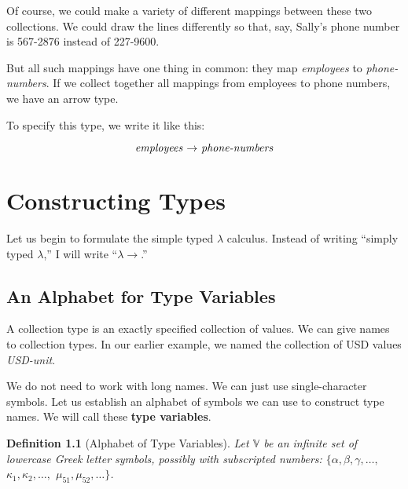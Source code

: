 \documentclass{book}
\numberwithin{equation}{chapter}
\newcommand{\vocab}{\textbf}
\newtheorem{definition}{Definition}
\begin{document}
Of course, we could make a variety of different mappings between these two collections. We could draw the lines differently so that, say, Sally's phone number is 567-2876 instead of 227-9600.

But all such mappings have one thing in common: they map \textit{employees} to \textit{phone-numbers}. If we collect together all mappings from employees to phone numbers, we have an arrow type. 

To specify this type, we write it like this:

\begin{equation}
\text{\textit{employees} $\rightarrow$ \textit{phone-numbers}}
\end{equation}




\chapter{Constructing Types}

Let us begin to formulate the simple typed $\lambda$ calculus. Instead of writing ``simply typed $\lambda$,'' I will write ``$\lambda\rightarrow$.''


\section{An Alphabet for Type Variables}

A collection type is an exactly specified collection of values. We can give names to collection types. In our earlier example, we named the collection of USD values \textit{USD-unit}. 

We do not need to work with long names. We can just use single-character symbols. Let us establish an alphabet of symbols we can use to construct type names. We will call these \vocab{type variables}.

\begin{definition}[Alphabet of Type Variables]
Let $\mathbb{V}$ be an infinite set of lowercase Greek letter symbols, possibly with subscripted numbers: $\{ \alpha, \beta, \gamma, \ldots,$ $\kappa_{1}, \kappa_{2}, \ldots,$ $\mu_{51}, \mu_{52}, \ldots \}$.
\end{definition}
\end{document}
